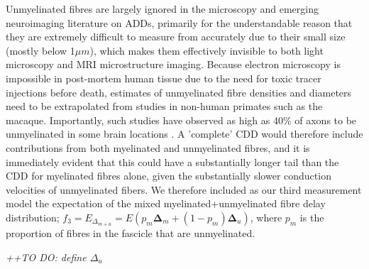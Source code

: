 Unmyelinated fibres are largely ignored in the microscopy and emerging neuroimaging literature on ADDs, primarily for the understandable reason that they are extremely difficult to measure from accurately due to their small size (mostly below 1$\mu m$), which makes them effectively invisible to both light microscopy and MRI microstructure imaging.  Because electron microscopy is impossible in post-mortem human tissue due to the need for toxic tracer injections before death, estimates of unmyelinated fibre densities and diameters need to be extrapolated from studies in non-human primates such as the macaque. Importantly, such studies have observed as high as 40\% of axons to be unmyelinated in some brain locations \citep{bowley2010age}. A 'complete' CDD would therefore include contributions from both myelinated and unmyelinated fibres, and it is immediately evident that this could have a substantially longer tail than the CDD for myelinated fibres alone, given the substantially slower conduction velocities of unmyelinated fibers. We therefore included as our third measurement model the expectation of the mixed myelinated+unmyelinated fibre delay distribution; $f_{3} = E_{\Delta_{m+u}} = E(p_m  \mathbf{\Delta}_{m} + (1-p_m) \mathbf{\Delta}_{u}) $, where $p_m$ is the proportion of fibres in the fascicle that are unmyelinated. 

\textit{++TO DO: define $\Delta_u$}






